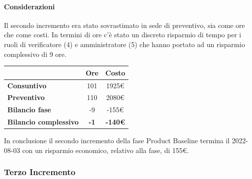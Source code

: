 \paragraph{Considerazioni} \hfill \break
Il secondo incremento era stato sovrastimato in sede di preventivo, sia come ore che come costi. In termini di ore c'è stato un discreto risparmio di tempo per i ruoli di verificatore (4) e amministratore (5) che hanno portato ad un risparmio complessivo di 9 ore.
\begin{center}
	\renewcommand{\arraystretch}{1.8}
	\begin{tabular}{ | l |c|c| }
    \hline
    & \textbf{Ore} & \textbf{Costo} \\
	\hline
    \textbf{Consuntivo} & 101 & 1925\euro \\
    \hline
    \textbf{Preventivo} & 110 & 2080\euro \\
    \hline
    \textbf{Bilancio fase} & -9 & -155\euro \\
    \hline
    \textbf{Bilancio complessivo} & \textbf{-1} & \textbf{-140\euro} \\
    \hline
    \end{tabular}
\end{center}
In conclusione il secondo incremento della fase Product Baseline termina il 2022-08-03 con un risparmio economico, relativo alla fase, di 155€.

\subsubsection{Terzo Incremento}

